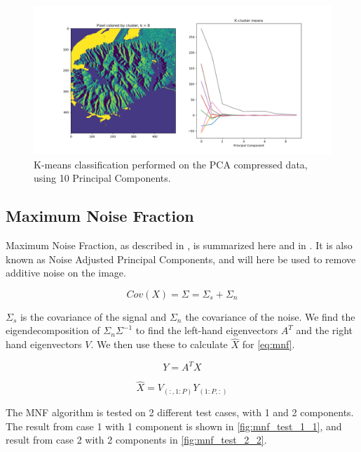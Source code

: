 \begin{figure}
    \centering
    \includegraphics[width=\textwidth]{../fig/kmean/PCA_8}
    \caption{K-means classification performed on the PCA compressed data, using 10 Principal Components.}
    \label{fig:pca_kmean}
\end{figure}


\subsection{Maximum Noise Fraction}
\label{sec:mnf}

Maximum Noise Fraction, as described in \cite{green1988}, is summarized here and in \cite{assignment}. 
It is also known as Noise Adjusted Principal Components, and will here be used to 
remove additive noise on the image. 


\begin{equation}
    Cov(X) = \Sigma = \Sigma_s + \Sigma_n
\end{equation}

$\Sigma_s$ is the covariance of the signal and $\Sigma_n$ the covariance of the noise. 
We find the eigendecomposition of $\Sigma_n \Sigma^{-1}$ to find the left-hand eigenvectors 
$A^T$ and the right hand eigenvectors $V$. We then use these to calculate $\hat{X}$ for \cref{eq:mnf}.

\begin{equation}
    Y = A^T X
\end{equation}

\begin{equation}
    \label{eq:mnf}
    \hat{X} = V_{(:, 1:P)} Y_{(1:P, :)}
\end{equation}

The MNF algorithm is tested on 2 different test cases, with 1 and 2 components. The result from case 1 with 
1 component is shown in \cref{fig:mnf_test_1_1}, and result from case 2 with 2 components in \cref{fig:mnf_test_2_2}. 

